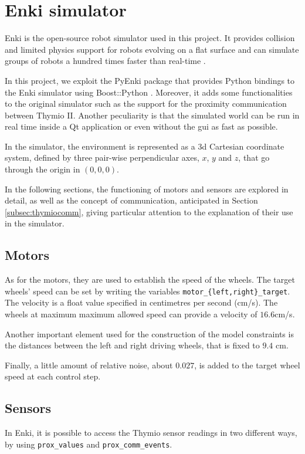 \section{Enki simulator}
\label{sec:enki}

Enki is the open-source robot simulator used in this project. It provides collision 
and limited physics support for robots evolving on a flat surface and can simulate 
groups of robots a hundred times faster than real-time \cite[][]{enki}.

In this project, we exploit the PyEnki package \cite[][]{enki-jguzzi} that provides 
Python bindings to the Enki simulator using Boost::Python 
\cite[][]{boostpython}.
Moreover, it adds some functionalities to the original simulator such as the 
support for the proximity communication between Thymio II.
Another peculiarity is that the simulated world can be run in real time inside a Qt 
application or even without the \gls{gui} as fast as possible.

In the simulator, the environment is represented as a \gls{3d} Cartesian 
coordinate system, defined by three pair-wise perpendicular axes, $x$, $y$ and 
$z$, that go through the origin in $(0, 0, 0)$. 

In the following sections, the functioning of motors and sensors are explored in 
detail, as well as the concept of communication, anticipated in Section 
\ref{subsec:thymiocomm}, giving particular attention to the explanation of their 
use in the simulator.

\subsection{Motors}
\label{subsec:enkimotors}
As for the motors, they are used to establish the speed of the wheels. The target 
wheels' speed can be set by writing the variables 
\texttt{motor\_\{left,right\}\_target}. The velocity is a float value specified in 
centimetres per second (\gls{cm/s}).
The wheels at maximum maximum allowed speed can provide a velocity of 
$16.6$\gls{cm/s}.

Another important element used for the construction of the model constraints is 
the distances between the left and right driving wheels, that is fixed to $9.4$ 
\gls{cm}.

Finally, a little amount of relative noise, about $0.027$, is added to the target 
wheel speed at each control step.

\subsection{Sensors}
\label{subsec:enkisensors}
In Enki, it is possible to access the Thymio sensor readings in two different ways, 
by using \texttt{prox\_values} and \texttt{prox\_comm\_events}.

